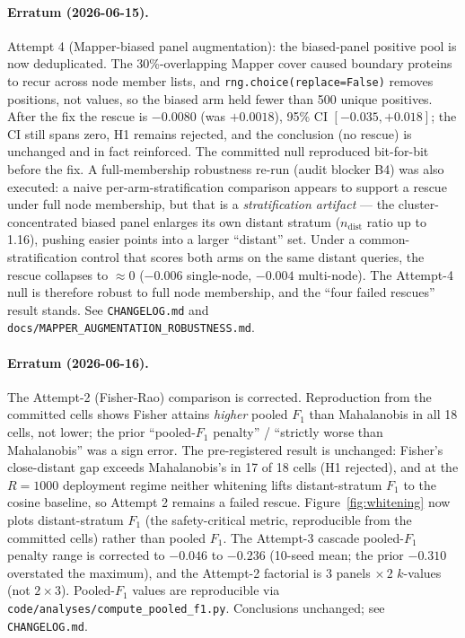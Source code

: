 \documentclass[11pt]{article}
\begin{document}
\paragraph{Erratum (2026-06-15).} Attempt 4 (Mapper-biased panel augmentation): the biased-panel positive pool is now deduplicated. The 30\%-overlapping Mapper cover caused boundary proteins to recur across node member lists, and \texttt{rng.choice(replace=False)} removes positions, not values, so the biased arm held fewer than 500 unique positives. After the fix the rescue is $-0.0080$ (was $+0.0018$), 95\% CI $[-0.035, +0.018]$; the CI still spans zero, H1 remains rejected, and the conclusion (no rescue) is unchanged and in fact reinforced. The committed null reproduced bit-for-bit before the fix. A full-membership robustness re-run (audit blocker B4) was also executed: a naive per-arm-stratification comparison appears to support a rescue under full node membership, but that is a \emph{stratification artifact} --- the cluster-concentrated biased panel enlarges its own distant stratum ($n_{\mathrm{dist}}$ ratio up to 1.16), pushing easier points into a larger ``distant'' set. Under a common-stratification control that scores both arms on the same distant queries, the rescue collapses to $\approx 0$ ($-0.006$ single-node, $-0.004$ multi-node). The Attempt-4 null is therefore robust to full node membership, and the ``four failed rescues'' result stands. See \texttt{CHANGELOG.md} and \texttt{docs/MAPPER\_AUGMENTATION\_ROBUSTNESS.md}.

\paragraph{Erratum (2026-06-16).} The Attempt-2 (Fisher-Rao) comparison is corrected. Reproduction from the committed cells shows Fisher attains \emph{higher} pooled $F_1$ than Mahalanobis in all 18 cells, not lower; the prior ``pooled-$F_1$ penalty'' / ``strictly worse than Mahalanobis'' was a sign error. The pre-registered result is unchanged: Fisher's close-distant gap exceeds Mahalanobis's in 17 of 18 cells (H1 rejected), and at the $R{=}1000$ deployment regime neither whitening lifts distant-stratum $F_1$ to the cosine baseline, so Attempt 2 remains a failed rescue. Figure~\ref{fig:whitening} now plots distant-stratum $F_1$ (the safety-critical metric, reproducible from the committed cells) rather than pooled $F_1$. The Attempt-3 cascade pooled-$F_1$ penalty range is corrected to $-0.046$ to $-0.236$ (10-seed mean; the prior $-0.310$ overstated the maximum), and the Attempt-2 factorial is $3$ panels $\times\,2$ $k$-values (not $2\times3$). Pooled-$F_1$ values are reproducible via \texttt{code/analyses/compute\_pooled\_f1.py}. Conclusions unchanged; see \texttt{CHANGELOG.md}.
\end{document}
